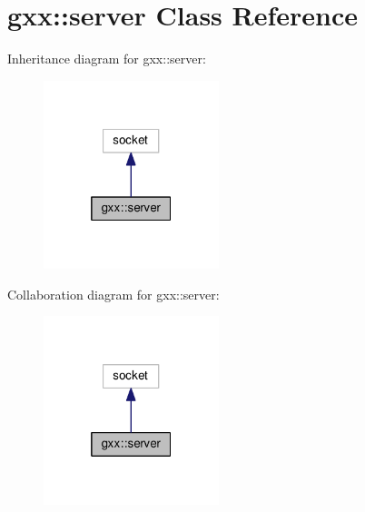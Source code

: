 \hypertarget{classgxx_1_1server}{}\section{gxx\+:\+:server Class Reference}
\label{classgxx_1_1server}


Inheritance diagram for gxx\+:\+:server\+:
\nopagebreak
\begin{figure}[H]
\begin{center}
\leavevmode
\includegraphics[width=145pt]{classgxx_1_1server__inherit__graph}
\end{center}
\end{figure}


Collaboration diagram for gxx\+:\+:server\+:
\nopagebreak
\begin{figure}[H]
\begin{center}
\leavevmode
\includegraphics[width=145pt]{classgxx_1_1server__coll__graph}
\end{center}
\end{figure}
